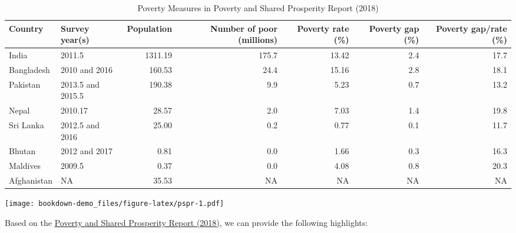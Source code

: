 \documentclass[13 pt,]{book}
\begin{document}
\begin{table}[t]

\caption{\label{tab:pspr}Poverty Measures in Poverty and Shared Prosperity Report (2018)}
\centering
\begin{tabular}{llrrrrr}
\toprule
Country & Survey year(s) & Population & Number of poor (millions) & Poverty rate (\%) & Poverty gap (\%) & Poverty gap/rate (\%)\\
\midrule
India & 2011.5 & 1311.19 & 175.7 & 13.42 & 2.4 & 17.7\\
Bangladesh & 2010 and 2016 & 160.53 & 24.4 & 15.16 & 2.8 & 18.1\\
Pakistan & 2013.5 and 2015.5 & 190.38 & 9.9 & 5.23 & 0.7 & 13.2\\
Nepal & 2010.17 & 28.57 & 2.0 & 7.03 & 1.4 & 19.8\\
Sri Lanka & 2012.5 and 2016 & 25.00 & 0.2 & 0.77 & 0.1 & 11.7\\
\addlinespace
Bhutan & 2012 and 2017 & 0.81 & 0.0 & 1.66 & 0.3 & 16.3\\
Maldives & 2009.5 & 0.37 & 0.0 & 4.08 & 0.8 & 20.3\\
Afghanistan & NA & 35.53 & NA & NA & NA & NA\\
\bottomrule
\end{tabular}
\end{table}

\texttt{[image: bookdown-demo\_files/figure-latex/pspr-1.pdf]}

Based on the
\href{http://www.worldbank.org/en/publication/poverty-and-shared-prosperity}{Poverty
and Shared Prosperity Report (2018)}, we can provide the following
highlights:
\end{document}
